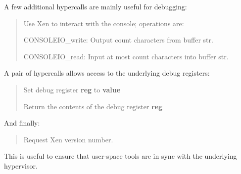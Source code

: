 \documentclass[11pt,twoside,final,openright]{report}
\newcommand{\hypercall}[1]{\vspace{2mm}{\sf #1}}
\begin{document}
A few additional hypercalls are mainly useful for debugging: 

\begin{quote} 
\hypercall{console\_io(int cmd, int count, char *str)}

Use Xen to interact with the console; operations are:

{CONSOLEIO\_write}: Output count characters from buffer str.

{CONSOLEIO\_read}: Input at most count characters into buffer str.
\end{quote} 

A pair of hypercalls allows access to the underlying debug registers: 
\begin{quote}
\hypercall{set\_debugreg(int reg, unsigned long value)}

Set debug register {\bf reg} to {\bf value} 

\hypercall{get\_debugreg(int reg)}

Return the contents of the debug register {\bf reg}
\end{quote}

And finally: 
\begin{quote}
\hypercall{xen\_version(int cmd)}

Request Xen version number.
\end{quote} 

This is useful to ensure that user-space tools are in sync 
with the underlying hypervisor. 
\end{document}
